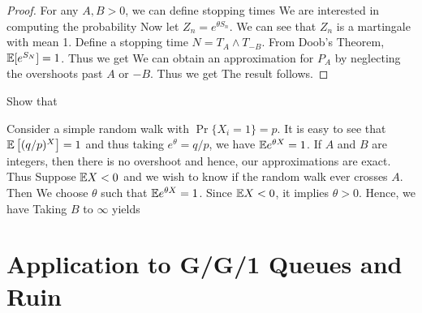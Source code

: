 \documentclass[a4paper,10pt,english]{article}
\begin{document}
\begin{proof}
For any $A,B > 0$, we can define stopping times
We are interested in computing the probability 
Now let $Z_n = e^{\theta S_n}$. We can see that $Z_n$ is a martingale with mean 1. 
Define a stopping time $N = T_A \wedge T_{-B}$. 
From Doob's Theorem, $\mathbb{E}[e^{S_N}] = 1$. 
Thus we get
We can obtain an approximation for $P_A$ by neglecting the overshoots past $A$ or $-B$. 
Thus we get
The result follows. 
\end{proof}
\begin{cor} 
Show that 
\end{cor}
\begin{shaded*}
\begin{exmp} 
Consider a simple random walk with $\Pr\{X_i = 1\} = p$.  
It is easy to see that $\mathbb{E}\left[(q/p)^X\right] = 1$ and thus taking $e^\theta = q/p$, we have $\mathbb{E} e^{\theta X} = 1$.  
If $A$ and $B$ are integers, then there is no overshoot and hence, our approximations are exact. Thus
Suppose $\mathbb{E} X < 0$ and we wish to know if the random walk ever crosses $A$. 
Then
We choose  $\theta$ such that $\mathbb{E} e^{\theta X} = 1$. 
Since $\mathbb{E} X<0$, it implies $\theta > 0$. 
Hence, we have
Taking $B$ to $\infty$ yields

\end{exmp}
\end{shaded*}

\section{Application to G/G/1 Queues and Ruin}
\end{document}

